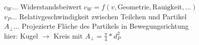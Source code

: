 $c_W$... Widerstandsbeiwert $c_W=f(v,\text{Geometrie}, \text{Rauigkeit},...)$\\
$v_P$... Relativgeschwindigkeit zwischen Teilchen und Partikel\\
$A_\perp$... Projezierte Fläche des Partikels in Bewegungsrichtung\\
hier: Kugel $\rightarrow$ Kreis mit $A_\perp=\frac{\pi}{4}*d_P^2$














